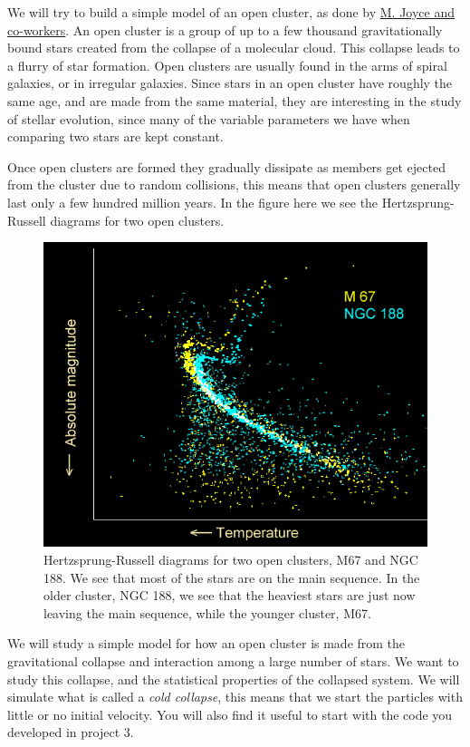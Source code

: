 \documentclass[%
oneside,                 %
final,                   %
10pt]{article}
\begin{document}
We will try to build a simple model of an open
cluster, as done by \href{{http://dx.doi.org/10.1063/1.3462740}}{M. Joyce and co-workers}. An
open cluster is a group of up to a few thousand gravitationally bound
stars created from the collapse of a molecular cloud. This collapse
leads to a flurry of star formation. Open clusters are usually found
in the arms of spiral galaxies, or in irregular galaxies. Since stars
in an open cluster have roughly the same age, and are made from the
same material, they are interesting in the study of stellar evolution,
since many of the variable parameters we have when comparing two stars
are kept constant.

Once open clusters are formed they gradually dissipate as members get
ejected from the cluster due to random collisions, this means that
open clusters generally last only a few hundred million years. In
the figure here we see the Hertzsprung-Russell diagrams for two open
clusters.


\begin{figure}[!ht]  %
  \centerline{\includegraphics[width=1.0\linewidth]{open_cluster_hr_diagram_ages.png}}
  \caption{
  Hertzsprung-Russell diagrams for two open clusters, M67 and   NGC 188. We see that most of the stars are on the main sequence. In   the older cluster, NGC 188, we see that the heaviest stars are just   now leaving the main sequence, while the younger cluster, M67.
  }
\end{figure}


We will study a simple model for how an open cluster is made from
the gravitational collapse and interaction among a large number of
stars. We want to study this collapse, and the statistical properties
of the collapsed system.
We will simulate what is called a
\emph{cold collapse}, this means that we start the particles with little
or no initial velocity. You will also find it useful to start with the code you developed in project 3.
\end{document}

